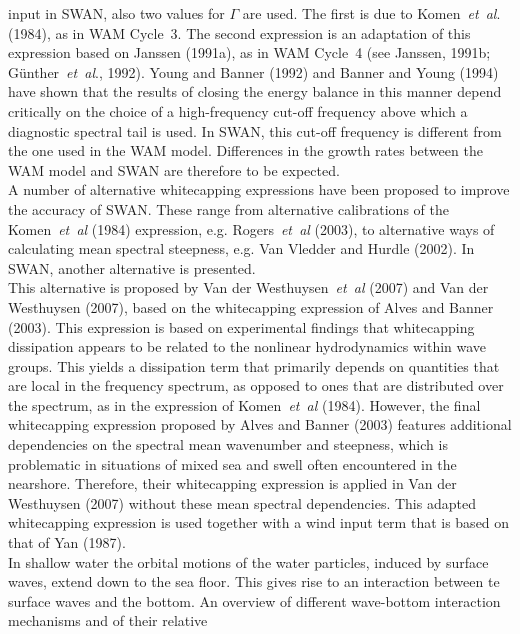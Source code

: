 \documentclass[12pt]{book}
\begin{document}
input in SWAN, also two values for $\Gamma$ are used. The first is due to Komen~{\it et~al}. (1984), as in WAM Cycle~3.
The second expression is an adaptation of this expression based on Janssen (1991a), as in WAM Cycle~4
(see Janssen, 1991b; G\"{u}nther~{\it et~al}., 1992). Young and Banner (1992) and Banner and Young (1994) have shown that
the results of closing the energy balance in this manner depend critically on the choice of a high-frequency cut-off
frequency above which a diagnostic spectral tail is used. In SWAN, this cut-off frequency is different from
the one used in the WAM model. Differences in the growth rates between the WAM model and SWAN are therefore to be
expected.
\nocite{Has74,Jan91b,Gun92HJ,You92B,Ban94Y}
\\[2ex]
\noindent
A number of alternative whitecapping expressions have been proposed to improve the accuracy of SWAN. These range
from alternative calibrations of the Komen~{\it et~al} (1984) expression, e.g. Rogers~{\it et~al} (2003), to
alternative ways of calculating mean spectral steepness, e.g. Van Vledder and Hurdle (2002).
In SWAN, another alternative is presented.
\nocite{Vle02H}
\\[2ex]
\noindent
This alternative is proposed by Van der Westhuysen~{\it et~al} (2007) and Van der Westhuysen (2007),
based on the whitecapping expression of Alves and Banner (2003). This expression is based
on experimental findings that whitecapping dissipation appears to be related to the nonlinear hydrodynamics within
wave groups. This yields a dissipation term that primarily depends on quantities that are local in the frequency
spectrum, as opposed to ones that are distributed over the spectrum, as in the expression of Komen~{\it et~al} (1984).
However, the final whitecapping expression proposed by Alves and Banner (2003) features additional dependencies on
the spectral mean wavenumber and steepness, which is problematic in situations of mixed sea and swell often
encountered in the nearshore. Therefore, their whitecapping expression is applied in Van der Westhuysen (2007)
without these mean spectral dependencies. This adapted whitecapping expression is used together with a wind input
term that is based on that of Yan (1987).
\nocite{Alv03B,Yan87,Wes07ZB,Wes07}
\\[2ex]
\noindent
In shallow water the orbital motions of the water particles, induced by surface waves, extend
down to the sea floor. This gives rise to an interaction between te surface waves and the
bottom. An overview of different wave-bottom interaction mechanisms and of their relative
\end{document}
